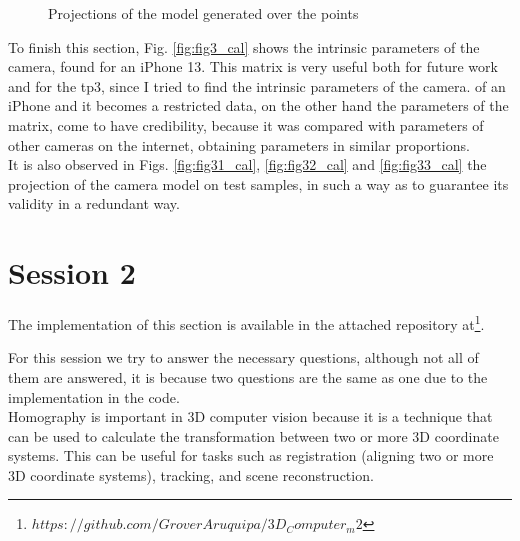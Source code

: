 \documentclass[12pt, twoside]{report}
\begin{document}
\begin{enumerate}
\begin{figure}[H]
        \caption{Projections of the model generated over the points}
        \label{fig:steps}
\end{figure}

To finish this section, Fig. \ref{fig:fig3_cal} shows the intrinsic parameters of the camera, found for an iPhone 13. This matrix is very useful both for future work and for the tp3, since I tried to find the intrinsic parameters of the camera. of an iPhone and it becomes a restricted data, on the other hand the parameters of the matrix, come to have credibility, because it was compared with parameters of other cameras on the internet, obtaining parameters in similar proportions.\\
It is also observed in Figs. \ref{fig:fig31_cal}, \ref{fig:fig32_cal} and \ref{fig:fig33_cal} the projection of the camera model on test samples, in such a way as to guarantee its validity in a redundant way.
    
\end{enumerate}










\chapter{Session 2}
The implementation of this section is available in the attached repository at\footnote{\href{https://github.com/GroverAruquipa/3D_Computer_m2}{$https://github.com/GroverAruquipa/3D_Computer_m2$}}.

For this session we try to answer the necessary questions, although not all of them are answered, it is because two questions are the same as one due to the implementation in the code.\\

Homography is important in 3D computer vision because it is a technique that can be used to calculate the transformation between two or more 3D coordinate systems. This can be useful for tasks such as registration (aligning two or more 3D coordinate systems), tracking, and scene reconstruction.
\end{document}
